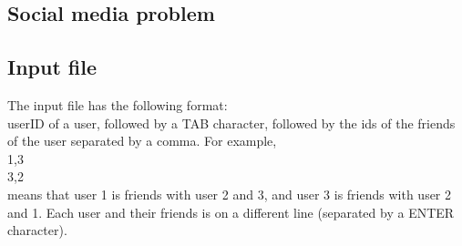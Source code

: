 \documentclass[11pt]{article}
\begin{document}
\begin{justifying}
\section{Social media problem}
\subsection{Input file}
The input file has the following format:\\
userID of a user, followed by a TAB character, followed by the ids of the friends of the user separated by a comma. For example,\\
1\space\space{},3\\
3\space\space{},2\\
means that user 1 is friends with user 2 and 3, and user 3 is friends with user 2 and 1. Each user and their friends is on a different line (separated by a ENTER character).


\end{justifying}
\end{document}
